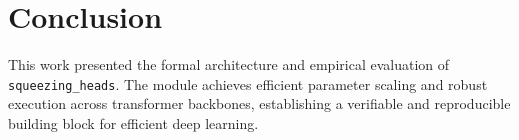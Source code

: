 \section{Conclusion}
This work presented the formal architecture and empirical evaluation of \texttt{squeezing_heads}. The module achieves efficient parameter scaling and robust execution across transformer backbones, establishing a verifiable and reproducible building block for efficient deep learning.
